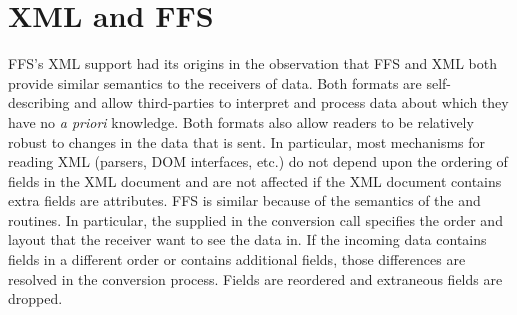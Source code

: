 \section{XML and FFS\label{XML}}

FFS's XML support had its origins in the observation that FFS and XML both
provide similar semantics to the receivers of data.  Both formats are
self-describing and allow third-parties to interpret and process data about
which they have no {\it a priori} knowledge.  Both formats also allow
readers to be relatively robust to changes in the data that is sent.  In
particular, most mechanisms for reading XML (parsers, DOM interfaces, etc.)
do not depend upon the ordering of fields in the XML document and are not
affected if the XML document contains extra fields are attributes.  FFS is
similar because of the semantics of the  and
 routines.  In particular, the
 supplied in the conversion call specifies the order
and layout that the receiver want to see the data in.  If the incoming data
contains fields in a different order or contains additional fields, those
differences are resolved in the conversion process.  Fields are reordered
and extraneous fields are dropped.

